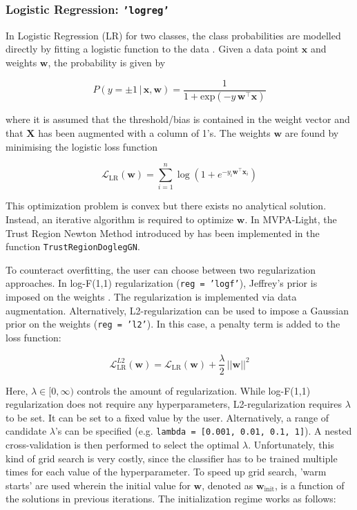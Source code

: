 \documentclass[utf8]{frontiersSCNS} %
\newcommand{\w}{\mathbf{w}}
\newcommand{\x}{\mathbf{x}}
\renewcommand{\L}{\mathcal{L}}
\newcommand{\X}{\mathbf{X}}
\newcommand{\ttt}[1]{\texttt{#1}}
\begin{document}
\subsubsection{Logistic Regression: \ttt{'logreg'}}

In Logistic Regression (LR) for two classes, the class probabilities are modelled directly by fitting a logistic function to the data \citep{Hastie2009}. Given a data point $\x$ and weights $\w$, the probability is given by

\begin{equation}
\label{eq:logreg_probability}
P(y = \pm 1\,|\,\x,\w) = \frac{1}{1 + \text{exp}(-y\,\w^\top\x)}
\end{equation}

where it is assumed that the threshold/bias is contained in the weight vector and that $\X$ has been augmented with a column of 1's. The weights $\w$ are found by minimising the logistic loss function

\begin{equation}
\label{eq:logreg_loss_function}
\L_\text{LR}(\w) = \sum_{i=1}^n \log(1 + e^{-y_i\w^\top\x_i})
\end{equation}

This optimization problem is convex but there exists no analytical solution. Instead, an iterative algorithm is required to optimize $\w$. In MVPA-Light, the Trust Region Newton Method introduced by \cite{Lin2007TrustRegression} has been implemented in the function \ttt{TrustRegionDoglegGN}.

To counteract overfitting, the user can choose between two regularization approaches. In log-F(1,1) regularization (\ttt{reg = 'logf'}), Jeffrey's prior is imposed on the weights \citep{Firth1993BiasEstimates,Rahman2017PerformanceData.,King2001}. The regularization is implemented via data augmentation. Alternatively, L2-regularization can be used to impose a Gaussian prior on the weights (\ttt{reg = 'l2'}). In this case, a penalty term is added to the loss function:

\begin{equation}
\label{eq:logreg_loss_function_plus_penalty}
\L_\text{LR}^{L2}(\w) = \L_\text{LR}(\w) + \frac{\lambda}{2}\, ||\w||^2
\end{equation}

Here, $\lambda\in [0,\infty)$ controls the amount of regularization. While log-F(1,1) regularization does not require any hyperparameters, L2-regularization requires $\lambda$ to be set. It can be set to a fixed value by the user. Alternatively, a range of candidate $\lambda$'s can be specified (e.g. \ttt{lambda = [0.001, 0.01, 0.1, 1]}). A nested cross-validation is then performed to select the optimal $\lambda$.
Unfortunately, this kind of grid search is very costly, since the classifier has to be trained multiple times for each value of the hyperparameter. To speed up grid search, 'warm starts' are used wherein the initial value for $\w$, denoted as  $\w_\text{init}$, is a function of the solutions in previous iterations. The initialization regime works as follows:
\end{document}
